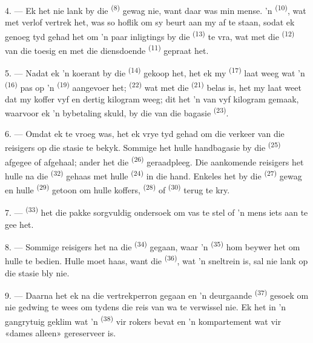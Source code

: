 4. --- Ek het nie lank by die  \textsuperscript{(8)} gewag nie, want daar
was min mense. 'n  \textsuperscript{(10)}, wat met verlof vertrek het,
was so hoflik om sy beurt aan my af te staan, sodat ek genoeg tyd gehad het om 'n paar
inligtings by die  \textsuperscript{(13)} te vra, wat met die
 \textsuperscript{(12)} van die toesig en met die diensdoende
 \textsuperscript{(11)} gepraat het.

\VUsaut{3.0mm}

5. --- Nadat ek 'n koerant by die  \textsuperscript{(14)} gekoop het,
het ek my  \textsuperscript{(17)} laat weeg wat 'n 
\textsuperscript{(16)} pas op 'n  \textsuperscript{(19)} aangevoer
het;  \textsuperscript{(22)} wat met die 
\textsuperscript{(21)} belas is, het my laat weet dat my koffer vyf en dertig kilogram
weeg; dit het 'n  van vyf kilogram gemaak, waarvoor ek 'n bybetaling
skuld, by die  van die bagasie \textsuperscript{(23)}.

6. --- Omdat ek te vroeg was, het ek vrye tyd gehad om die verkeer van die reisigers op
die stasie te bekyk. Sommige het hulle handbagasie by die 
\textsuperscript{(25)} afgegee of afgehaal; ander het die 
\textsuperscript{(26)} geraadpleeg. Die aankomende reisigers het hulle na die
 \textsuperscript{(32)} gehaas met hulle 
\textsuperscript{(24)} in die hand. Enkeles het by die 
\textsuperscript{(27)} gewag en hulle  \textsuperscript{(29)} getoon om
hulle koffers,  \textsuperscript{(28)} of 
\textsuperscript{(30)} terug te kry.

7. ---  \textsuperscript{(33)} het die pakke
sorgvuldig ondersoek om vas te stel of 'n mens iets aan te gee het.

8. --- Sommige reisigers het na die  \textsuperscript{(34)} gegaan, waar
'n  \textsuperscript{(35)} hom beywer het om hulle te bedien. Hulle moet
haas, want die  \textsuperscript{(36)}, wat 'n sneltrein is, sal nie lank
op die stasie bly nie.

9. --- Daarna het ek na die vertrekperron gegaan en 'n deurgaande 
\textsuperscript{(37)} gesoek om nie gedwing te wees om tydens die reis van wa te
verwissel nie. Ek het in 'n gangrytuig geklim wat 'n 
\textsuperscript{(38)} vir rokers bevat en 'n kompartement wat vir «dames alleen»
gereserveer is.

